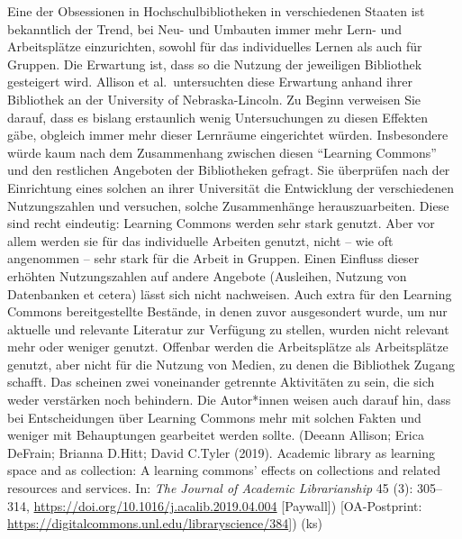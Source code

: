 \documentclass[a4paper,
fontsize=11pt,
oneside,
numbers=noperiodatend,
parskip=half-,
bibliography=totoc,
final
]{scrartcl}
\begin{document}
Eine der Obsessionen in Hochschulbibliotheken in verschiedenen Staaten
ist bekanntlich der Trend, bei Neu- und Umbauten immer mehr Lern- und
Arbeitsplätze einzurichten, sowohl für das individuelles Lernen als auch
für Gruppen. Die Erwartung ist, dass so die Nutzung der jeweiligen
Bibliothek gesteigert wird. Allison et al.~untersuchten diese Erwartung
anhand ihrer Bibliothek an der University of Nebraska-Lincoln. Zu Beginn
verweisen Sie darauf, dass es bislang erstaunlich wenig Untersuchungen
zu diesen Effekten gäbe, obgleich immer mehr dieser Lernräume
eingerichtet würden. Insbesondere würde kaum nach dem Zusammenhang
zwischen diesen \enquote{Learning Commons} und den restlichen Angeboten
der Bibliotheken gefragt. Sie überprüfen nach der Einrichtung eines
solchen an ihrer Universität die Entwicklung der verschiedenen
Nutzungszahlen und versuchen, solche Zusammenhänge herauszuarbeiten.
Diese sind recht eindeutig: Learning Commons werden sehr stark genutzt.
Aber vor allem werden sie für das individuelle Arbeiten genutzt, nicht
-- wie oft angenommen -- sehr stark für die Arbeit in Gruppen. Einen
Einfluss dieser erhöhten Nutzungszahlen auf andere Angebote (Ausleihen,
Nutzung von Datenbanken et cetera) lässt sich nicht nachweisen. Auch
extra für den Learning Commons bereitgestellte Bestände, in denen zuvor
ausgesondert wurde, um nur aktuelle und relevante Literatur zur
Verfügung zu stellen, wurden nicht relevant mehr oder weniger genutzt.
Offenbar werden die Arbeitsplätze als Arbeitsplätze genutzt, aber nicht
für die Nutzung von Medien, zu denen die Bibliothek Zugang schafft. Das
scheinen zwei voneinander getrennte Aktivitäten zu sein, die sich weder
verstärken noch behindern. Die Autor*innen weisen auch darauf hin, dass
bei Entscheidungen über Learning Commons mehr mit solchen Fakten und
weniger mit Behauptungen gearbeitet werden sollte. (Deeann Allison;
Erica DeFrain; Brianna D.Hitt; David C.Tyler (2019). Academic library as
learning space and as collection: A learning commons' effects on
collections and related resources and services. In: \emph{The Journal of
Academic Librarianship} 45 (3): 305--314,
\url{https://doi.org/10.1016/j.acalib.2019.04.004} {[}Paywall{]})
{[}OA-Postprint:
\url{https://digitalcommons.unl.edu/libraryscience/384}{]}) (ks)
\end{document}
